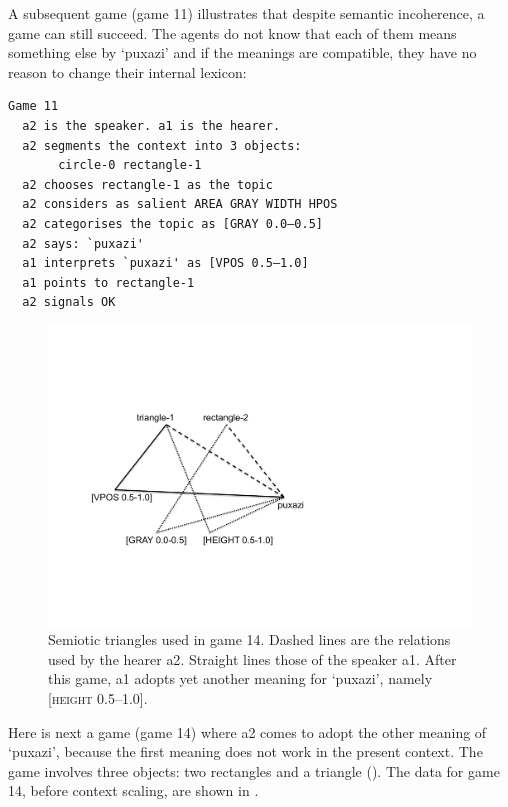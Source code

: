 A subsequent game (game 11) illustrates that despite 
semantic incoherence, a game can still succeed. The agents 
do not know that each of them means something else by 
`puxazi' and if the meanings are compatible, they 
have no reason to change their internal lexicon:
\clearpage
\begin{verbatim}
Game 11
  a2 is the speaker. a1 is the hearer. 
  a2 segments the context into 3 objects: 
       circle-0 rectangle-1
  a2 chooses rectangle-1 as the topic 
  a2 considers as salient AREA GRAY WIDTH HPOS 
  a2 categorises the topic as [GRAY 0.0–0.5]
  a2 says: `puxazi'
  a1 interprets `puxazi' as [VPOS 0.5–1.0]
  a1 points to rectangle-1
  a2 signals OK 
\end{verbatim}



\begin{figure}[htbp]
  \centerline{\includegraphics[width=.60\textwidth]{chap6/figs/triangle3.pdf}}
\caption{\label{triangle3}Semiotic triangles used in
game 14. Dashed lines are the relations used by 
the hearer {\bfshape  a2}. Straight lines those of the 
speaker {\bfshape  a1}. After this game, {\bfshape  a1}
adopts yet another meaning for `puxazi', namely 
{}[\textsc{height} 0.5–1.0].}
\end{figure}
Here is next a game (game 14) where {\bfshape  a2} comes to adopt 
the other meaning of `puxazi', because the first
meaning does not work in the present context. 
The game involves three objects: two rectangles and a 
triangle ().
The data for game 14, before context scaling, are
shown in . 


